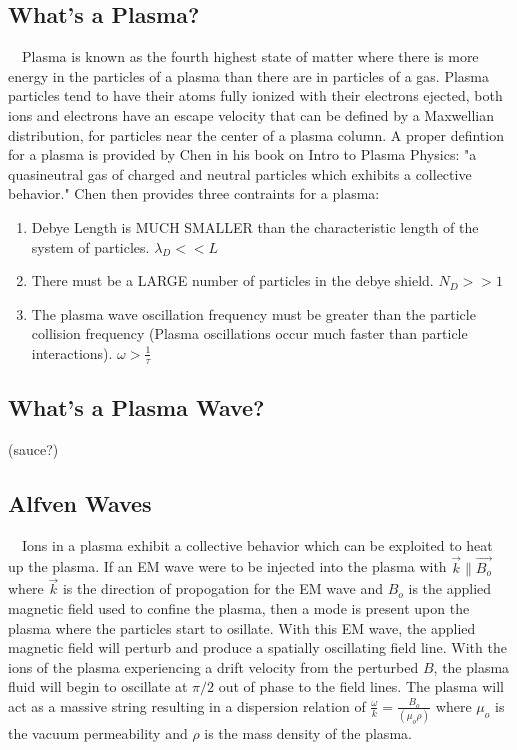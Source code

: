 \documentclass[11pt]{article}
\theoremstyle{quest}
\begin{document}
\subsection{What's a Plasma?}
~~Plasma is known as the fourth highest state of matter where there is more energy in the particles of a plasma than there are in particles of a gas. Plasma particles tend to have their atoms fully ionized with their electrons ejected, both ions and electrons have an escape velocity that can be defined by a Maxwellian distribution, for particles near the center of a plasma column. A proper defintion for a plasma is provided by Chen in his book on Intro to Plasma Physics: "a quasineutral gas of charged and neutral particles which exhibits a collective behavior." Chen then provides three contraints for a plasma:
\begin{enumerate}
	\item Debye Length is MUCH SMALLER than the characteristic length of the system of particles. $\lambda_D << L$
	\item There must be a LARGE number of particles in the debye shield. $N_D>>1$
	\item The plasma wave oscillation frequency must be greater than the particle collision frequency (Plasma oscillations occur much faster than particle interactions). $\omega > \frac{1}{\tau}$
\end{enumerate}
\subsection{What's a Plasma Wave?}
(sauce?)
\subsection{Alfven Waves}
~~Ions in a plasma exhibit a collective behavior which can be exploited to heat up the plasma. If an EM wave were to be injected into the plasma with $\vec{k} \parallel \vec{B_o}$ where $\vec{k}$ is the direction of propogation for the EM wave and $B_o$ is the applied magnetic field used to confine the plasma, then a mode is present upon the plasma where the particles start to osillate. With this EM wave, the applied magnetic field will perturb and produce a spatially oscillating field line. With the ions of the plasma experiencing a drift velocity from the perturbed $B$, the plasma fluid will begin to oscillate at $\pi/2$ out of phase to the field lines. The plasma will act as a massive string resulting in a dispersion relation of $\frac{\omega}{k} = \frac{B_o}{\left( \mu_o \rho\right)}$ where $\mu_o$ is the vacuum permeability and $\rho$ is the mass density of the plasma.\\
\end{document}
